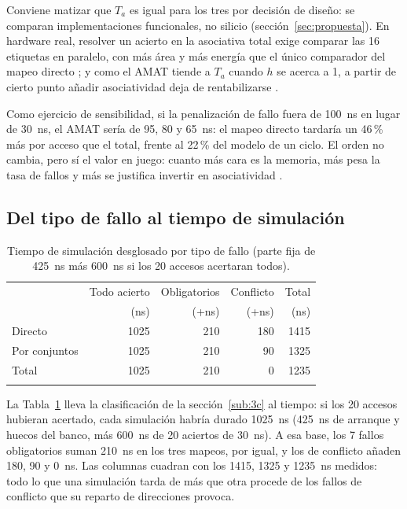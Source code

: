 \documentclass[llncs]{llncs}
\begin{document}
Conviene matizar que $T_a$ es igual para los tres por decisión de
diseño: se comparan implementaciones funcionales, no silicio
(sección~\ref{sec:propuesta}). En hardware real, resolver un acierto
en la asociativa total exige comparar las 16 etiquetas en paralelo, con
más área y más energía que el único comparador del mapeo directo
\cite{hennessy2019,wikipedia-cpu-cache}; y como el AMAT tiende a $T_a$
cuando $h$ se acerca a 1, a partir de cierto punto añadir
asociatividad deja de rentabilizarse \cite{hennessy2019}.

Como ejercicio de sensibilidad, si la penalización de fallo fuera de
100~ns en lugar de 30~ns, el AMAT sería de 95, 80 y 65~ns: el mapeo
directo tardaría un 46\,\% más por acceso que el total, frente al
22\,\% del modelo de un ciclo. El orden no cambia, pero sí el valor en
juego: cuanto más cara es la memoria, más pesa la tasa de fallos y más
se justifica invertir en asociatividad \cite{hennessy2019}.

\subsection{Del tipo de fallo al tiempo de simulación}

\begin{table}[t]
\centering
\small
\begin{tabular}{@{}lrrrr@{}}
\hline
\noalign{\smallskip}
 & Todo acierto & Obligatorios & Conflicto & Total \\
 & (ns) & (+ns) & (+ns) & (ns) \\
\noalign{\smallskip}\hline\noalign{\smallskip}
Directo & 1025 & 210 & 180 & 1415 \\
Por conjuntos & 1025 & 210 & 90 & 1325 \\
Total & 1025 & 210 & 0 & 1235 \\
\noalign{\smallskip}\hline
\end{tabular}
\caption{Tiempo de simulación desglosado por tipo de fallo (parte fija
de 425~ns más 600~ns si los 20 accesos acertaran todos).}
\label{tab:desglose}
\end{table}

La Tabla~\ref{tab:desglose} lleva la clasificación de la
sección~\ref{sub:3c} al tiempo: si los 20 accesos hubieran acertado,
cada simulación habría durado 1025~ns (425~ns de arranque y huecos del
banco, más 600~ns de 20 aciertos de 30~ns). A esa base, los 7 fallos
obligatorios suman 210~ns en los tres mapeos, por igual, y los de
conflicto añaden 180, 90 y 0~ns. Las columnas cuadran con los 1415,
1325 y 1235~ns medidos: todo lo que una simulación tarda de más que
otra procede de los fallos de conflicto que su reparto de direcciones
provoca.
\end{document}
